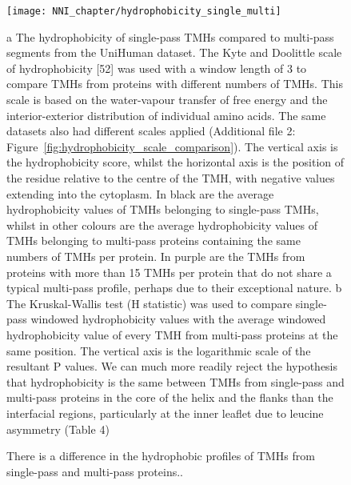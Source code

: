\begin{figure}[!ht]
\centering
\texttt{[image: NNI\_chapter/hydrophobicity\_single\_multi]}
\caption{There is a difference in the hydrophobic profiles of TMHs from single-pass and multi-pass proteins..}
\medskip
\justify
\small
 a The hydrophobicity of single-pass TMHs compared to multi-pass segments from the UniHuman dataset. The Kyte and Doolittle scale of hydrophobicity [52] was used with a window length of 3 to compare TMHs from proteins with different numbers of TMHs. This scale is based on the water-vapour transfer of free energy and the interior-exterior distribution of individual amino acids. The same datasets also had different scales applied (Additional file 2: Figure~\ref{fig:hydrophobicity_scale_comparison}). The vertical axis is the hydrophobicity score, whilst the horizontal axis is the position of the residue relative to the centre of the TMH, with negative values extending into the cytoplasm. In black are the average hydrophobicity values of TMHs belonging to single-pass TMHs, whilst in other colours are the average hydrophobicity values of TMHs belonging to multi-pass proteins containing the same numbers of TMHs per protein. In purple are the TMHs from proteins with more than 15 TMHs per protein that do not share a typical multi-pass profile, perhaps due to their exceptional nature. b The Kruskal-Wallis test (H statistic) was used to compare single-pass windowed hydrophobicity values with the average windowed hydrophobicity value of every TMH from multi-pass proteins at the same position. The vertical axis is the logarithmic scale of the resultant P values. We can much more readily reject the hypothesis that hydrophobicity is the same between TMHs from single-pass and multi-pass proteins in the core of the helix and the flanks than the interfacial regions, particularly at the inner leaflet due to leucine asymmetry (Table 4)
\label{fig:hydrophobicity_single_multi}
\end{figure}

